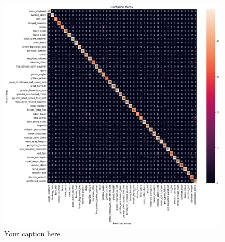\documentclass[fleqn, 10pt, twoside]{IOEGC}
\begin{document}
\begin{figure}[t] %
	\centering
	\begin{minipage}{\textwidth} %
		\includegraphics[scale=0.45]{Graphics/vision_cm.png} %
		\caption{Your caption here.}
		\label{cm_vision}
	\end{minipage}
\end{figure}
\end{document}
